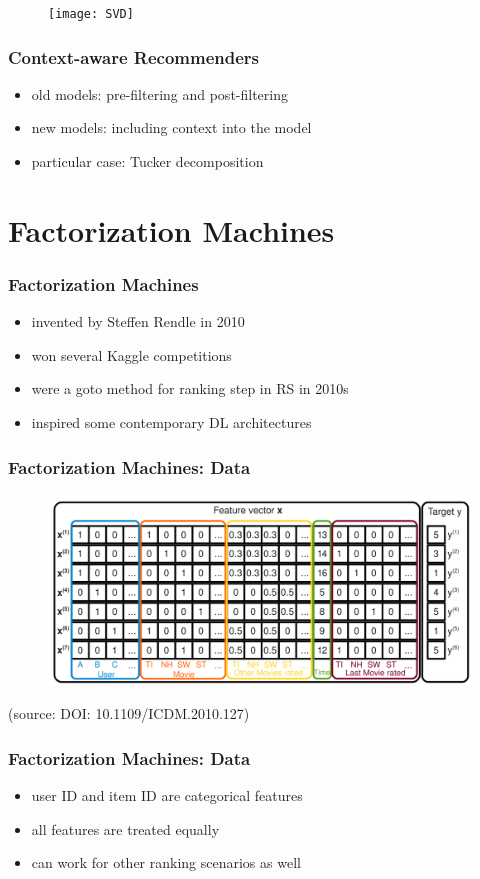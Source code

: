 \documentclass{beamer}
\begin{document}
\begin{frame}
  \begin{figure}
  \texttt{[image: SVD]}
  \end{figure}
\end{frame}
\begin{frame}
  \frametitle{Context-aware Recommenders}
  \begin{itemize}
  \item old models: pre-filtering and post-filtering
  \item new models: including context into the model
  \item particular case: Tucker decomposition
  \end{itemize}
\end{frame}
\section{Factorization Machines}
\begin{frame}
  \frametitle{Factorization Machines}
  \begin{itemize}
  \item invented by Steffen Rendle in 2010
  \item won several Kaggle competitions
  \item were a goto method for ranking step in RS in 2010s
  \item inspired some contemporary DL architectures
  \end{itemize}
\end{frame}
\begin{frame}
  \frametitle{Factorization Machines: Data}
  \begin{figure}
    \includegraphics[scale=0.17]{fm}
  \end{figure}
  (source: DOI: 10.1109/ICDM.2010.127)
\end{frame}
\begin{frame}
  \frametitle{Factorization Machines: Data}
  \begin{itemize}
  \item user ID and item ID are categorical features
  \item all features are treated equally
  \item can work for other ranking scenarios as well
  \end{itemize}
\end{frame}
\end{document}
